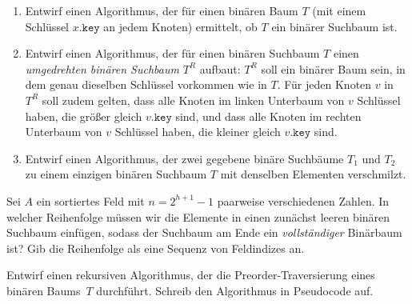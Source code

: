 \documentclass{uebung_cs}
\begin{document}
\begin{aufgabe}\mbox{}
	\begin{enumerate}
		\item \mittel Entwirf einen Algorithmus, der für einen binären Baum $T$ (mit einem Schlüssel $x.\texttt{key}$ an jedem Knoten) ermittelt, ob $T$ ein binärer Suchbaum ist.
		\item \mittel Entwirf einen Algorithmus, der für einen binären Suchbaum $T$ einen \textit{umgedrehten binären Suchbaum} $T^R$ aufbaut:
		$T^R$ soll ein binärer Baum sein, in dem genau dieselben Schlüssel vorkommen wie in $T$.
		Für jeden Knoten $v$ in $T^R$ soll zudem gelten, dass alle Knoten im linken Unterbaum von $v$ Schlüssel haben, die größer gleich $v.\texttt{key}$ sind, und dass alle Knoten im rechten Unterbaum von $v$ Schlüssel haben, die kleiner gleich $v.\texttt{key}$ sind.
		\item \note %
    Entwirf einen Algorithmus, der zwei gegebene binäre Suchbäume $T_1$ und $T_2$ zu einem einzigen binären Suchbaum $T$ mit denselben Elementen verschmilzt.
	\end{enumerate}
\end{aufgabe}

\begin{aufgabe}
	Sei $A$ ein sortiertes Feld mit $n = 2^{h+1}-1$ paarweise verschiedenen Zahlen.
	In welcher Reihenfolge müssen wir die Elemente in einen zunächst leeren binären Suchbaum einfügen, sodass der Suchbaum am Ende ein \emph{vollständiger} Binärbaum ist?
	Gib die Reihenfolge als eine Sequenz von Feldindizes an.
\end{aufgabe}

\begin{aufgabe}
	Entwirf einen rekursiven Algorithmus, der die Preorder-Traversierung eines binären Baums~$T$ durchführt.
	Schreib den Algorithmus in Pseudocode auf.
\end{aufgabe}
\end{document}
